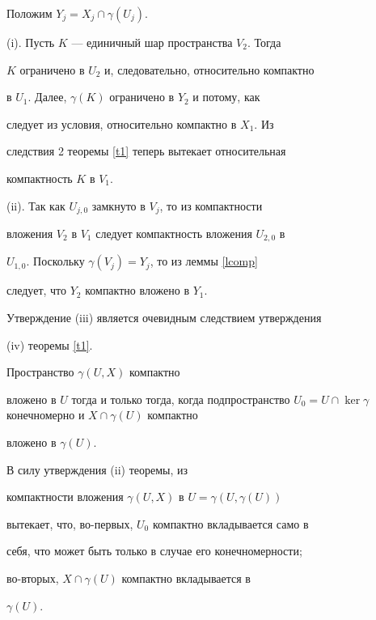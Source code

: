 \begin{pf}


Положим $Y_j=X_j \cap \gamma(U_j)$.





(i). Пусть $K$ --- единичный шар пространства $V_2$. Тогда


$K$ ограничено в $U_2$ и, следовательно, относительно компактно


в $U_1$. Далее, $\gamma(K)$ ограничено в $Y_2$ и потому, как


следует из условия, относительно компактно в $X_1$. Из


следствия 2 теоремы \ref{t1} теперь вытекает относительная


компактность $K$ в $V_1$.





(ii). Так как $U_{j,0}$ замкнуто в $V_j$, то из компактности


вложения $V_2$ в $V_1$ следует компактность вложения $U_{2,0}$ в


$U_{1,0}$. Поскольку $\gamma(V_j)=Y_j$, то из леммы \ref{lcomp}


следует, что $Y_2$ компактно вложено в $Y_1$.





Утверждение (iii) является очевидным следствием утверждения


(iv) теоремы \ref{t1}.


\end{pf}





\begin{cornonum}


Пространство $\gamma(U,X)$ компактно


вложено в $U$ тогда и только тогда, когда подпространство $U_0=U


\cap \ker \gamma$ конечномерно и $X \cap \gamma(U)$ компактно


вложено в $\gamma(U)$.


\end{cornonum}





\begin{pf}


В силу утверждения (ii) теоремы, из


компактности вложения $\gamma(U,X)$ в $U=\gamma(U, \gamma(U))$


вытекает, что, во-первых, $U_0$ компактно вкладывается само в


себя, что может быть только в случае его конечномерности;


во-вторых, $X \cap \gamma(U)$ компактно вкладывается в


$\gamma(U)$.


\end{pf}





